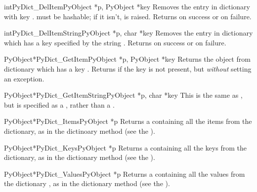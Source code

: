 \begin{cfuncdesc}{int}{PyDict_DelItem}{PyObject *p, PyObject *key}
  Removes the entry in dictionary  with key .
   must be hashable; if it isn't,  is
  raised.  Returns  on success or  on failure.
\end{cfuncdesc}

\begin{cfuncdesc}{int}{PyDict_DelItemString}{PyObject *p, char *key}
  Removes the entry in dictionary  which has a key specified by
  the string .  Returns  on success or  on
  failure.
\end{cfuncdesc}

\begin{cfuncdesc}{PyObject*}{PyDict_GetItem}{PyObject *p, PyObject *key}
  Returns the object from dictionary  which has a key
  .  Returns \NULL{} if the key  is not present, but
  \emph{without} setting an exception.
\end{cfuncdesc}

\begin{cfuncdesc}{PyObject*}{PyDict_GetItemString}{PyObject *p, char *key}
  This is the same as , but  is
  specified as a , rather than a .
\end{cfuncdesc}

\begin{cfuncdesc}{PyObject*}{PyDict_Items}{PyObject *p}
  Returns a  containing all the items from the
  dictionary, as in the dictinoary method  (see the
  ).
\end{cfuncdesc}

\begin{cfuncdesc}{PyObject*}{PyDict_Keys}{PyObject *p}
  Returns a  containing all the keys from the
  dictionary, as in the dictionary method  (see the
  ).
\end{cfuncdesc}

\begin{cfuncdesc}{PyObject*}{PyDict_Values}{PyObject *p}
  Returns a  containing all the values from the
  dictionary , as in the dictionary method 
  (see the ).
\end{cfuncdesc}


